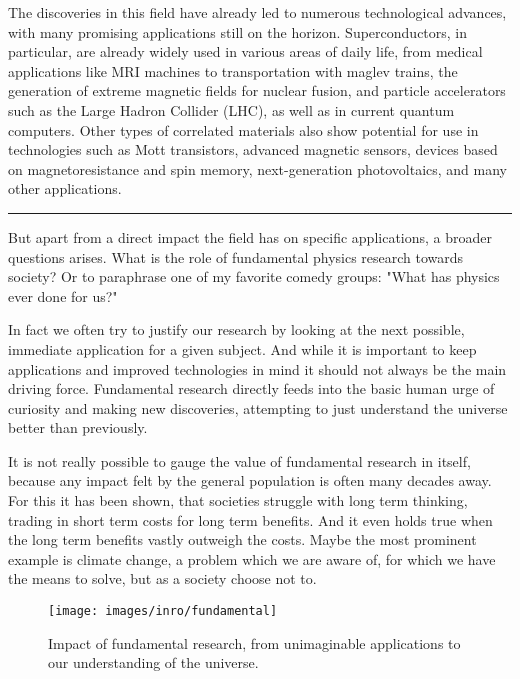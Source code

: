 The discoveries in this field have already led to numerous technological advances, with many promising applications still on the horizon.
Superconductors, in particular, are already widely used in various areas of daily life, from medical applications like MRI machines to transportation with maglev trains, the generation of extreme magnetic fields for nuclear fusion, and particle accelerators such as the Large Hadron Collider (LHC), as well as in current quantum computers.
Other types of correlated materials also show potential for use in technologies such as Mott transistors, advanced magnetic sensors, devices based on magnetoresistance and spin memory, next-generation photovoltaics, and many other applications.

\begin{center}
	\rule{0.3\textwidth}{.8pt}
\end{center}

But apart from a direct impact the field has on specific applications, a broader questions arises.
What is the role of fundamental physics research towards society?
Or to paraphrase one of my favorite comedy groups: "What has physics ever done for us?"

In fact we often try to justify our research by looking at the next possible, immediate application for a given subject.
And while it is important to keep applications and improved technologies in mind it should not always be the main driving force.
Fundamental research directly feeds into the basic human urge of curiosity and making new discoveries, attempting to just understand the universe better than previously.

It is not really possible to gauge the value of fundamental research in itself, because any impact felt by the general population is often many decades away.
For this it has been shown, that societies struggle with long term thinking, trading in short term costs for long term benefits.
And it even holds true when the long term benefits vastly outweigh the costs.
Maybe the most prominent example is climate change, a problem which we are aware of, for which we have the means to solve, but as a society choose not to.

\begin{figure}
	\centering
	\texttt{[image: images/inro/fundamental]}
	\caption{Impact of fundamental research, from unimaginable applications to our understanding of the universe.}
	\label{fig:fundamental}
\end{figure}



